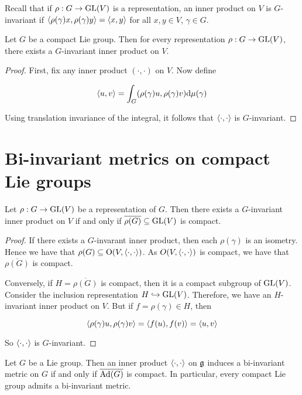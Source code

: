 \documentclass{article}
\begin{document}
Recall that if \(\rho : G \to \operatorname{GL}(V)\) is a representation, an inner product on \(V\) is \(G\)-invariant if \(\left\langle \rho(\gamma)x, \rho(\gamma)y \right\rangle = \left\langle x, y \right\rangle\) for all \(x, y \in V\), \(\gamma \in G\).

\begin{theorem}
    Let \(G\) be a compact Lie group. Then for every representation \(\rho : G \to \operatorname{GL}(V)\), there exists a \(G\)-invariant inner product on \(V\).
\end{theorem}

\begin{proof}
    First, fix any inner product \((\cdot, \cdot)\) on \(V\). Now define

    \[\left\langle u, v \right\rangle = \int_G (\rho(\gamma)u, \rho(\gamma)v)\dd\mu(\gamma)\]

    Using translation invariance of the integral, it follows that \(\left\langle \cdot, \cdot \right\rangle\) is \(G\)-invariant.
\end{proof}

\section{Bi-invariant metrics on compact Lie groups}

\begin{theorem}
    Let \(\rho : G \to \operatorname{GL}(V)\) be a representation of \(G\). Then there exists a \(G\)-invariant inner product on \(V\) if and only if \(\overline{\rho(G)} \subseteq \operatorname{GL}(V)\) is compact.
\end{theorem}

\begin{proof}
    If there exists a \(G\)-invarant inner product, then each \(\rho(\gamma)\) is an isometry. Hence we have that \(\rho(G) \subseteq \mathrm{O}(V, \left\langle \cdot, \cdot \right\rangle)\). As \(O(V, \left\langle \cdot, \cdot \right\rangle)\) is compact, we have that \(\overline{\rho(G)}\) is compact.

    Conversely, if \(H = \overline{\rho(G)}\) is compact, then it is a compact subgroup of \(\operatorname{GL}(V)\). Consider the inclusion representation \(H \hookrightarrow \operatorname{GL}(V)\). Therefore, we have an \(H\)-invariant inner product on \(V\). But if \(f = \rho(\gamma) \in H\), then

    \[\left\langle \rho(\gamma)u, \rho(\gamma)v \right\rangle = \left\langle f(u), f(v) \right\rangle = \left\langle u, v \right\rangle\]

    So \(\left\langle \cdot, \cdot \right\rangle\) is \(G\)-invariant.
\end{proof}

\begin{corollary}
    Let \(G\) be a Lie group. Then an inner product \(\left\langle \cdot, \cdot \right\rangle\) on \(\mathfrak{g}\) induces a bi-invariant metric on \(G\) if and only if \(\overline{\operatorname{Ad}(G)}\) is compact. In particular, every compact Lie group admits a bi-invariant metric.
\end{corollary}
\end{document}
